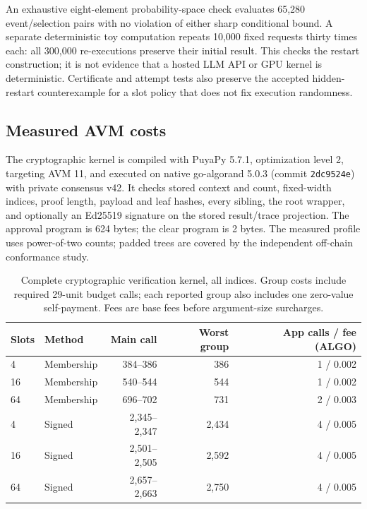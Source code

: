 An exhaustive eight-element probability-space check evaluates 65,280 event/selection pairs with no violation of either sharp conditional bound. A separate deterministic toy computation repeats 10,000 fixed requests thirty times each: all 300,000 re-executions preserve their initial result. This checks the restart construction; it is not evidence that a hosted LLM API or GPU kernel is deterministic. Certificate and attempt tests also preserve the accepted hidden-restart counterexample for a slot policy that does not fix execution randomness.

\subsection{Measured AVM costs}
\label{sec:avm}

The cryptographic kernel is compiled with PuyaPy 5.7.1, optimization level 2, targeting AVM 11, and executed on native go-algorand 5.0.3 (commit \texttt{2dc9524e}) with private consensus v42. It checks stored context and count, fixed-width indices, proof length, payload and leaf hashes, every sibling, the root wrapper, and optionally an Ed25519 signature on the stored result/trace projection. The approval program is 624 bytes; the clear program is 2 bytes. The measured profile uses power-of-two counts; padded trees are covered by the independent off-chain conformance study.

\begin{table}[t]
\centering\small
\caption{Complete cryptographic verification kernel, all indices. Group costs include required 29-unit budget calls; each reported group also includes one zero-value self-payment. Fees are base fees before argument-size surcharges.}
\label{tab:avm}
\begin{tabular}{llrrr}
\toprule
Slots & Method & Main call & Worst group & App calls / fee (ALGO)\\
\midrule
4 & Membership & 384--386 & 386 & 1 / 0.002\\
16 & Membership & 540--544 & 544 & 1 / 0.002\\
64 & Membership & 696--702 & 731 & 2 / 0.003\\
4 & Signed & 2,345--2,347 & 2,434 & 4 / 0.005\\
16 & Signed & 2,501--2,505 & 2,592 & 4 / 0.005\\
64 & Signed & 2,657--2,663 & 2,750 & 4 / 0.005\\
\bottomrule
\end{tabular}
\end{table}

